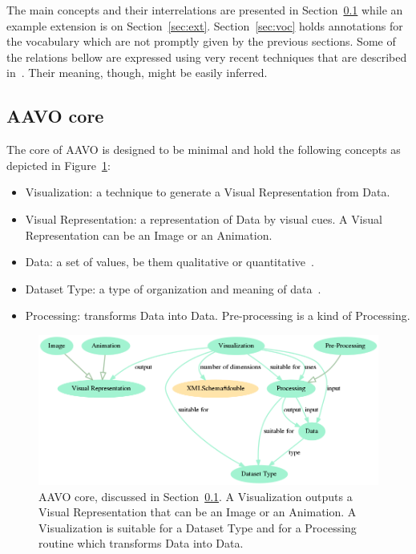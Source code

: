 \documentclass[12pt,fleqn]{article}
\begin{document}
The main concepts and their interrelations are presented in
Section~\ref{sec:core} while an example extension is on Section~\ref{sec:ext}.
Section~\ref{sec:voc} holds annotations for the vocabulary which are not promptly
given by the previous sections.
Some of the relations bellow are expressed using very recent 
techniques that are described in~\cite{enhance}.
Their meaning, though, might be easily inferred.

\subsection{AAVO core}\label{sec:core}
The core of AAVO is designed to be minimal and hold the following concepts as
depicted in Figure~\ref{fig:minimum}:
\begin{itemize}
	\item Visualization: a technique to generate a Visual Representation from Data.
	\item Visual Representation: a representation of Data by visual cues.
		A Visual Representation can be an Image or an Animation.
	\item Data: a set of values, be them qualitative or quantitative~\citep{wikipData}.
	\item Dataset Type: a type of organization and meaning of data~\citep{munzner}.
	\item Processing: transforms Data into Data. Pre-processing is a kind of Processing.
\end{itemize}

\begin{figure}[!htbp] %
\vspace{-2pt}
\begin{center}
\includegraphics[width=\textwidth]{../figs/aavo0.01_minimum.png}
	\caption{AAVO core, discussed in Section~\ref{sec:core}.
	A Visualization outputs a Visual Representation that can be an Image or an Animation.
	A Visualization is suitable for a Dataset Type and for a Processing routine which transforms
	Data into Data.}
\label{fig:minimum}%
\end{center}
\end{figure}
\end{document}
